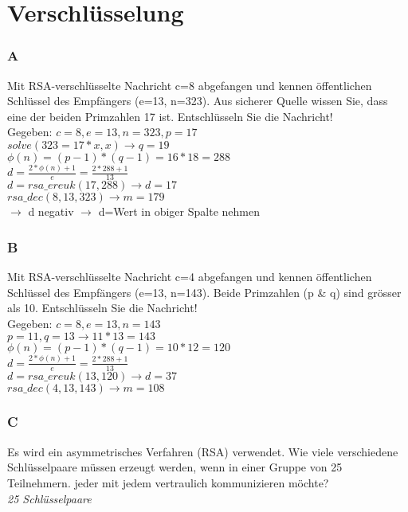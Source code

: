 

\section{Verschlüsselung}
\subsubsection{A}
Mit RSA-verschlüsselte Nachricht c=8 abgefangen und kennen öffentlichen Schlüssel des Empfängers (e=13, n=323).
Aus sicherer Quelle wissen Sie, dass eine der beiden Primzahlen 17 ist. Entschlüsseln Sie die Nachricht!\\
Gegeben: $c=8, e=13, n=323, p=17$\\
$solve(323=17*x,x) \rightarrow q=19$\\
$\phi(n) = (p-1)*(q-1) = 16*18=288$\\
$d=\frac{2*\phi(n)+1}{e}=\frac{2*288+1}{13}$\\
$d=rsa\_ereuk(17,288) \rightarrow d=17$\\
$rsa\_dec(8,13,323) \rightarrow m=179$\\
$\rightarrow$ d negativ $\rightarrow$ d=Wert in obiger Spalte nehmen

\subsubsection{B}
Mit RSA-verschlüsselte Nachricht c=4 abgefangen und kennen öffentlichen Schlüssel des Empfängers (e=13, n=143).
Beide Primzahlen (p \& q) sind grösser als 10. Entschlüsseln Sie die Nachricht!\\
Gegeben: $c=8, e=13, n=143$\\
$p=11, q=13 \rightarrow 11*13 = 143$\\
$\phi(n) = (p-1)*(q-1) = 10*12=120$\\
$d=\frac{2*\phi(n)+1}{e}=\frac{2*288+1}{13}$\\
$d=rsa\_ereuk(13,120) \rightarrow d=37$\\
$rsa\_dec(4,13,143) \rightarrow m=108$

\subsubsection{C}
Es wird ein asymmetrisches Verfahren (RSA) verwendet. Wie viele verschiedene Schlüsselpaare müssen erzeugt werden, wenn in einer Gruppe von 25 Teilnehmern. jeder mit jedem vertraulich kommunizieren möchte?\\
\textit{25 Schlüsselpaare}\\

